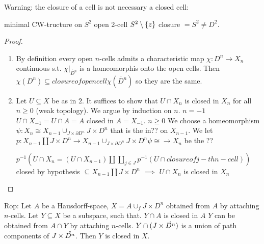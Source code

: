 \documentclass{TemplateLecture}
\begin{document}
Warning: the closure of a cell is not necessary a closed cell:

minimal CW-tructure on \(S^2\) open 2-cell \(S^2\setminus \{z\}\) closure \(= S^2 \neq D^2\).

\begin{proof}
    \begin{enumerate}
        \item By definition every open \(n\)-cells admits a characteristic map \(\chi\colon D^n \to X_n\) continuous s.t. \(\chi\rvert_{\mathring{D^n}}\) is a homeomorphis onto the open cells. Then \(\chi(D^n) \subseteq closure of open cell \chi(\mathring{D^n})\) so they are the same.

        \item Let \(U\subseteq X\) be as in \(2\). It suffices to show that \(U\cap X_n\) is closed in \(X_n\) for all \(n \geq 0\) (weak topology). We argue by induction on \(n\).
        \(n = -1\) \(U\cap X_{-1} = U\cap A = A\) closed in \(A = X_{-1}\).
        \(n \geq 0\) We choose a homeomorphism \(\psi\colon X_n \cong X_{n-1} \cup_{J\times \partial D^n} J\times D^n\) that is the in?? on \(X_{n-1}\). We let \(p\colon X_{n-1} \amalg J\times D^n \to X_{n-1} \cup_{J\times \partial D^n} J\times D^n \psi \cong \to X_n\) be the ?? 

        \(p^{-1}(U\cap X_n = (U\cap X_{n-1}) \amalg \coprod_{j \in J} p^{-1}(U\cap closure of j-th n-cell))\) closed by hypothesis \(\subseteq X_{n-1} \amalg J\times D^n\)
        \(\implies\) \(U\cap X_n\) is closed in \(X_n\)
    \end{enumerate}
\end{proof}

Rop: Let \(A\) be a Hausdorff-space, \(X = A \cup_f J\times D^n\) obtained from \(A\) by attaching \(n\)-cells. Let \(Y \subseteq X\) be a subspace, such that.
\(Y \cap A\) is closed in \(A\)
\(Y\) can be obtained from \(A \cap Y\) by attaching \(n\)-cells.
\(Y \cap (J\times \mathring{D^n})\) is a union of path components of \(J\times \mathring{D^n}\).
Then \(Y\) is closed in \(X\).
\end{document}
